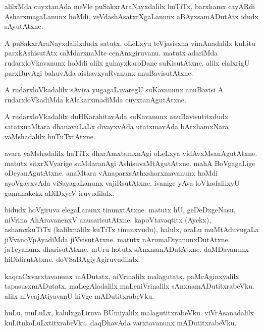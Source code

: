 \documentclass{article}
\begin{document}
\begin{mn}%
alilxMda cuyxtanAda meVle puSakxrAraNayxdalilx huTiTx, barxhamx
cayARdi AsharxmagaLanunx hoMdi, veVdashAsatxrXgaLanunx aBAyxsamADutAtx
idudx sAyutAtxne.
\end{mn}

\begin{mn}
A puSakxrAraNayxdalilxdudx satutx, oLeLxyu teVjasisxna vimAnadalilx
kuLitu parxkAshisutAtx caMdarxnaMte cenAnxgiruvanu. matutx adariMda
rudarxloVkavanunx hoMdi alilx guhayxkaroDane suKisutAtxne. alilx
elalxrigU parxBuvAgi bahuvAda aishavxyaRvanunx anuBavisutAtxne.
\end{mn}

\begin{mn}
A rudarxloVkadalilx sAvira yugagaLavaregU suKavanunx anuBavisi A
rudarxloVkadiMda kAlakarxmadiMda cuyxtanAgutAtxne.
\end{mn}

\begin{mn}
A rudarxloVkadalilx duHKarahitavAda suKavanunx anuBavisutitxdudx
satatxnaMtara dhanavuLaLx divayxvAda utatxmavAda bArxhamxNara
vaMshadalilx huTuTxtAtxne.
\end{mn}

\begin{mn}
avara vaMshadalilx huTiTx dharAmxtamxnAgi oLeLxya
vidAvxMsanAgutAtxne. matutx sitxrXVyarige suMdaranAgi
AshisuvaMtAgutAtxne. mahA BoVgagaLige oDeyanAgutAtxne. anaMtara
vAnaparxsAthxsharxmavanunx hoMdi ayoVgayxvAda viSayagaLanunx
vajiRsutAtxne. ivanige yAva loVkadalilxyU gamanakekx aDiDxyeV iruvudilalx.
\end{mn}

\begin{mn}
bidudx hoVgiruva elegaLanunx tinunxtAtxne. matutx hU, geDeDxgeNasu,
niVrina AhAravanenxV anusarisutAtxne. kapoVtavaqtitx (Ayekx),
ashamxkuTiTx (kalilxnalilx kuTiTx tinunxvudu), halulx, oraLu
muMtAduvugaLa jiVvanoVpAyadiMda jiVvisutAtxne. matutx
nArumaDiyanunxDutAtxne. jaTeyanunx dharisutAtxne. mUru hotutx
sAnxnamADutAtxne. daMDavanunx hiDidirutAtxne. doVSaBAgiyAgiruvudilalx.
\end{mn}

\begin{mn}
kaqcaCxvarxtavanunx mADutatx, niVrinalilx malagutatx, paMcAginxyalilx
tapasusxmADutatx, maLegAladalilx maLeniVrinalilx
sAnxnamADutitxrabeVku. alilx niVcajAtiyavanU hiVge mADutitxrabeVku.
\end{mn}

\begin{mn}
huLu, muLuLx, kalulxgaLiruva BUmiyalilx
malagutitxrabeVku. viVrAsanadalilx kuLitukoLuLxtitxrabeVku. daqDhavAda
varxtavanunx mADutitxrabeVku.
\end{mn}
\end{document}
